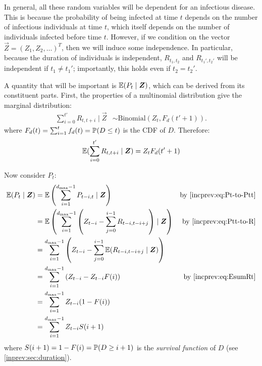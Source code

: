 \documentclass[thesis.tex]{subfiles}
\begin{document}
In general, all these random variables will be dependent for an infectious disease.
This is because the probability of being infected at time $t$ depends on the number of infectious individuals at time $t$, which itself depends on the number of individuals infected before time $t$.
However, if we condition on the vector $\vec{Z} = (Z_1, Z_2, \dots)^T$, then we will induce some independence.
In particular, because the duration of individuals is independent, $R_{t_1,t_2}$ and $R_{t_1',t_2'}$ will be independent if $t_1 \neq t_1'$; importantly, this holds even if $t_2 = t_2'$.

A quantity that will be important is $\operatorname{\mathbb{E}}(P_t \mid \bm{Z})$, which can be derived from its constituent parts.
First, the properties of a multinomial distribution give the marginal distribution:
\begin{align}
  \sum_{i=0}^{t'} R_{t,t+i} \mid \vec{Z} &\sim \text{Binomial}(Z_t, F_d(t'+1)).
\end{align}
where $F_d(t) = \sum_{i=1}^t f_d(t) = \operatorname{\mathbb{P}}(D \leq t)$ is the CDF of $D$.
Therefore:
\begin{align}
  \operatorname{\mathbb{E}}(\sum_{i=0}^{t'} R_{t,t+i} \mid \bm{Z}) = Z_t F_d(t'+1) \label{incprev:eq:EsumRt}
\end{align}

Now consider $P_t$:
\begin{align}
\E(P_t \mid \vec{Z})
  &= \E\left(\sum_{i=1}^{d_\text{max}-1} P_{t-i,t} \mid \vec{Z} \right) &\text{by \cref{incprev:eq:Pt-to-Ptt}} \\
  &= \E\left(\sum_{i=1}^{d_\text{max}-1} \left( Z_{t-i} - \sum_{j=0}^{i-1} R_{t-i,t-i+j} \right) \mid \vec{Z} \right) &\text{by \cref{incprev:eq:Ptt-to-R}}\\
  &= \sum_{i=1}^{d_\text{max}-1} \left( Z_{t-i} - \sum_{j=0}^{i-1} \E( R_{t-i,t-i+j} \mid \vec{Z}) \right) \\
  &= \sum_{i=1}^{d_\text{max}-1} \left( Z_{t-i} - Z_{t-i} F(i) \right) &\text{by \cref{incprev:eq:EsumRt}}\\
  &= \sum_{i=1}^{d_\text{max}-1} Z_{t-i} (1 - F(i)) \\
  &= \sum_{i=1}^{d_\text{max}-1} Z_{t-i} S(i+1)
\end{align}
where $S(i+1) = 1-F(i) = \operatorname{\mathbb{P}}(D \geq i+1)$ is the \emph{survival function} of $D$ (see \cref{inprev:sec:duration}).

\end{document}
